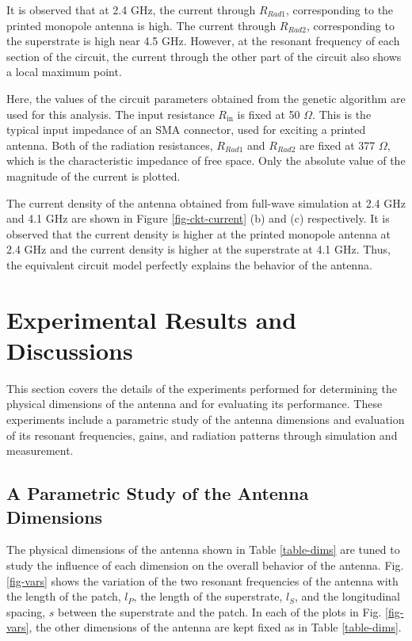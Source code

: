It is observed that at 2.4 GHz, the current through $R_{Rad1}$, corresponding to the printed monopole antenna is high. The current through $R_{Rad2}$, corresponding to the superstrate is high near 4.5 GHz. However, at the resonant frequency of each section of the circuit, the current through the other part of the circuit also shows a local maximum point.

Here, the values of the circuit parameters obtained from the genetic algorithm are used for this analysis. The input resistance $R_{\text{in}}$ is fixed at 50 $\Omega$. This is the typical input impedance of an SMA connector, used for exciting a printed antenna. Both of the radiation resistances, $R_{Rad1}$ and $R_{Rad2}$ are fixed at 377 $\Omega$, which is the characteristic impedance of free space. Only the absolute value of the magnitude of the current is plotted.

The current density of the antenna obtained from full-wave simulation at 2.4 GHz and 4.1 GHz are shown in Figure \ref{fig-ckt-current} (b) and (c) respectively. It is observed that the current density is higher at the printed monopole antenna at 2.4 GHz and the current density is higher at the superstrate at 4.1 GHz. Thus, the equivalent circuit model perfectly explains the behavior of the antenna.

\section{Experimental Results and Discussions}\label{sec:expt_results}
This section covers the details of the experiments performed for determining the physical dimensions of the antenna and for evaluating its performance. These experiments include a parametric study of the antenna dimensions and evaluation of its resonant frequencies, gains, and radiation patterns through simulation and measurement.

\subsection{A Parametric Study of the Antenna Dimensions}
The physical dimensions of the antenna shown in Table \ref{table-dims} are tuned to study the influence of each dimension on the overall behavior of the antenna. Fig. \ref{fig-vars} shows the variation of the two resonant frequencies of the antenna with the length of the patch, $l_P$, the length of the superstrate, $l_S$, and the longitudinal spacing, $s$ between the superstrate and the patch. In each of the plots in Fig. \ref{fig-vars}, the other dimensions of the antenna are kept fixed as in Table \ref{table-dims}.

